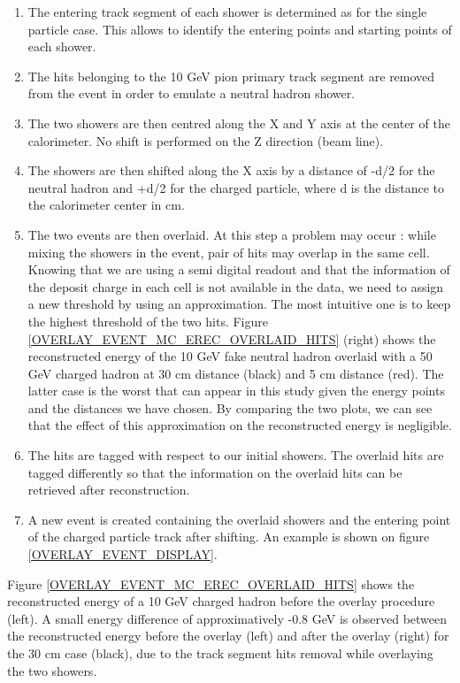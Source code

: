 \documentclass[cits]{JINST}
\begin{document}
\begin{enumerate}
  \item The entering track segment of each shower is determined as for the single particle case. This allows to identify the entering points and starting points of each shower.
  \item The hits belonging to the 10 GeV pion primary track segment are removed from the event in order to emulate a neutral hadron shower.
  \item The two showers are then centred along the X and Y axis at the center of the calorimeter. No shift is performed on the Z direction (beam line).
  \item The showers are then shifted along the X axis by a distance of -d/2 for the neutral hadron and +d/2 for the charged particle, where d is the distance to the calorimeter center in cm.
  \item The two events are then overlaid. At this step a problem may occur : while mixing the showers in the event, pair of hits may overlap in the same cell. Knowing that we are using a semi digital readout and that the information of the deposit charge in each cell is not available in the data, we need to assign a new threshold by using an approximation. The most intuitive one is to keep the highest threshold of the two hits. Figure \ref{OVERLAY_EVENT_MC_EREC_OVERLAID_HITS} (right) shows the reconstructed energy of the 10 GeV fake neutral hadron overlaid with a 50 GeV charged hadron at 30 cm distance (black) and 5 cm distance (red). The latter case is the worst that can appear in this study given the energy points and the distances we have chosen. By comparing the two plots, we can see that the effect of this approximation on the reconstructed energy is negligible.
  \item The hits are tagged with respect to our initial showers. The overlaid hits are tagged differently so that the information on the overlaid hits can be retrieved after reconstruction.
  \item A new event is created containing the overlaid showers and the entering point of the charged particle track after shifting. An example is shown on figure \ref{OVERLAY_EVENT_DISPLAY}.
\end{enumerate}

Figure \ref{OVERLAY_EVENT_MC_EREC_OVERLAID_HITS} shows the reconstructed energy of a 10 GeV charged hadron before the overlay procedure (left). A small energy difference of approximatively -0.8 GeV is observed between the reconstructed energy before the overlay (left) and after the overlay (right) for the 30 cm case (black), due to the track segment hits removal while overlaying the two showers.
\end{document}
